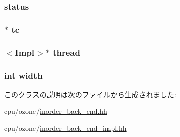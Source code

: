 \label{classInorderBackEnd_a34292b1418c46ca63c892e7826510d77}
\hypertarget{classInorderBackEnd_ae29aa2d4ae440022daaed1107eb306b3}{
\subsubsection[{status}]{ {\bf status}}}
\label{classInorderBackEnd_ae29aa2d4ae440022daaed1107eb306b3}
\hypertarget{classInorderBackEnd_a4455a4759e69e5ebe68ae7298cbcc37d}{
\subsubsection[{tc}]{$\ast$ {\bf tc}}}
\label{classInorderBackEnd_a4455a4759e69e5ebe68ae7298cbcc37d}
\hypertarget{classInorderBackEnd_ab6f834310107fd693035eba2eeca583f}{
\subsubsection[{thread}]{$<$Impl$>$$\ast$ {\bf thread}}}
\label{classInorderBackEnd_ab6f834310107fd693035eba2eeca583f}
\hypertarget{classInorderBackEnd_a2474a5474cbff19523a51eb1de01cda4}{
\subsubsection[{width}]{\setlength{\rightskip}{0pt plus 5cm}int {\bf width}}}
\label{classInorderBackEnd_a2474a5474cbff19523a51eb1de01cda4}


このクラスの説明は次のファイルから生成されました:\begin{DoxyCompactItemize}
\item 
cpu/ozone/\hyperlink{inorder__back__end_8hh}{inorder\_\-back\_\-end.hh}\item 
cpu/ozone/\hyperlink{inorder__back__end__impl_8hh}{inorder\_\-back\_\-end\_\-impl.hh}\end{DoxyCompactItemize}
